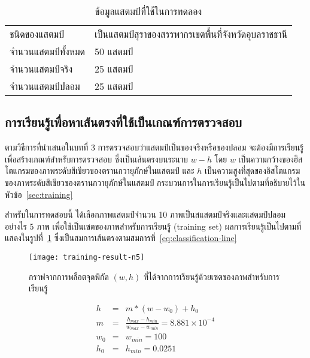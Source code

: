 \begin{table}[htb]
\caption{ข้อมูลแสตมป์ที่ใช้ในการทดลอง}
\label{tab:data}
\begin{tabular}{ll}
\hline 
ชนิดของแสตมป์       &เป็นแสตมป์สุราของสรรพากรเขตพื้นที่จังหวัดอุบลราชธานี\\
จำนวนแสตมป์ทั้งหมด          &50 แสตมป์\\
จำนวนแสตมป์จริง               & 25 แสตมป์\\
จำนวนแสตมป์ปลอม            &25 แสตมป์\\
\hline
\end{tabular}
\end{table} 

\subsection{การเรียนรู้เพื่อหาเส้นตรงที่ใช้เป็นเกณฑ์การตรวจสอบ}

ตามวิธีการที่นำเสนอในบทที่ 3 การตรวจสอบว่าแสตมป์เป็นของจริงหรือของปลอม จะต้องมีการเรียนรู้เพื่อสร้างเกณฑ์สำหรับการตรวจสอบ ซึ่งเป็นเส้นตรงบนระนาบ $w-h$ โดย 
               $w$ เป็นความกว้างของฮิสโตแกรมของภาพระดับสีเขียวของตรานกวายุภักษ์ในแสตมป์ และ
               $h$ เป็นความสูงที่สุดของอิสโตแกรมของภาพระดับสีเขียวของตรานกวายุภักษ์ในแสตมป์ 
              กระบวนการในการเรียนรู้เป็นไปตามที่อธิบายไว้ในหัวข้อ~\ref{sec:training}

สำหรับในการทดสอบนี้ ได้เลือกภาพแสตมป์จำนวน 10 ภาพเป็นสแสตมป์จริงและแสตมป์ปลอมอย่างไร 5 ภาพ เพื่อใช้เป็นเซตของภาพสำหรับการเรียนรู้ (training set) ผลการเรียนรู้เป็นไปตามที่แสดงในรูปที่~\ref{fig:training-result} ซึ่งเป็นสมการเส้นตรงตามสมการที่~\ref{eq:classification-line}

\begin{figure}[!ht]
\centering
\vspace{2em}
\texttt{[image: training-result-n5]}
\vspace{2em}
\caption{กราฟจากการพล็อตจุดพิกัด $(w,h)$ ที่ได้จากการเรียนรู้ด้วยเซตของภาพสำหรับการเรียนรู้}
\label{fig:training-result}
\end{figure}

\begin{eqnarray}
h &=& m*(w - w_{0}) + h_{0} \label{eq:classification-line}\\
m &=& \frac{h_{max} - h_{min}}{w_{max}-w_{min}} = 8.881\times 10^{-4}\nonumber\\
w_0 &=& w_{min} = 100\nonumber\\
h_0 &=& h_{min}  = 0.0251\nonumber\\\nonumber
\end{eqnarray}

